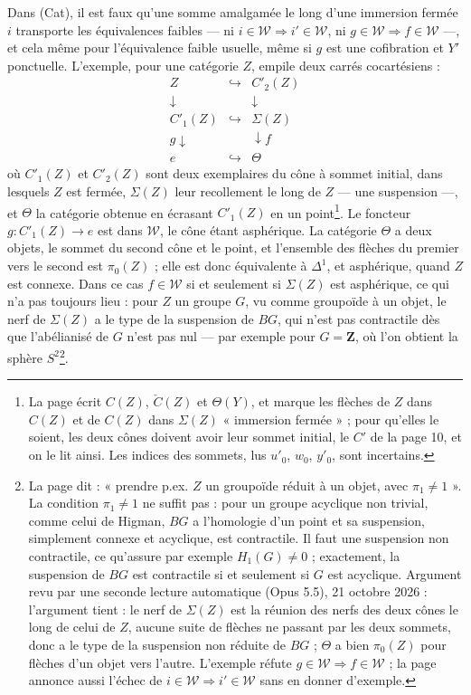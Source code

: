 \documentclass[11pt,a4paper]{article}
\begin{document}
Dans (Cat), il est faux qu'une somme amalgamée le long d'une immersion fermée
$i$ transporte les équivalences faibles --- ni $i \in \mathcal{W} \Rightarrow
i' \in \mathcal{W}$, ni $g \in \mathcal{W} \Rightarrow f \in \mathcal{W}$ ---,
et cela même pour l'équivalence faible usuelle, même si $g$ est une
cofibration et $Y'$ ponctuelle. L'exemple, pour une catégorie $Z$, empile deux
carrés cocartésiens :
\[
\begin{array}{ccc}
Z & \hookrightarrow & C'_{2}(Z) \\
\downarrow & & \downarrow \\
C'_{1}(Z) & \hookrightarrow & \Sigma(Z) \\
{\scriptstyle g}\downarrow & & \downarrow{\scriptstyle f} \\
e & \hookrightarrow & \Theta
\end{array}
\]
où $C'_{1}(Z)$ et $C'_{2}(Z)$ sont deux exemplaires du cône à sommet initial,
dans lesquels $Z$ est fermée, $\Sigma(Z)$ leur recollement le long de $Z$ ---
une suspension ---, et $\Theta$ la catégorie obtenue en écrasant $C'_{1}(Z)$
en un point\footnote{La page écrit $C(Z)$, $\check{C}(Z)$ et $\Theta(Y)$, et
marque les flèches de $Z$ dans $C(Z)$ et de $C(Z)$ dans $\Sigma(Z)$
« immersion fermée » ; pour qu'elles le soient, les deux cônes doivent avoir
leur sommet initial, le $C'$ de la page 10, et on le lit ainsi. Les indices
des sommets, lus $u'_{0}$, $w_{0}$, $y'_{0}$, sont incertains.}. Le
foncteur $g : C'_{1}(Z) \to e$ est dans $\mathcal{W}$, le cône étant
asphérique. La catégorie $\Theta$ a deux objets, le sommet du second cône et
le point, et l'ensemble des flèches du premier vers le second est $\pi_{0}(Z)$ ;
elle est donc équivalente à $\Delta^{1}$, et asphérique, quand $Z$ est
connexe. Dans ce cas $f \in \mathcal{W}$ si et seulement si $\Sigma(Z)$ est
asphérique, ce qui n'a pas toujours lieu : pour $Z$ un groupe $G$, vu comme
groupoïde à un objet, le nerf de $\Sigma(Z)$ a le type de la suspension de
$BG$, qui n'est pas contractile dès que l'abélianisé de $G$ n'est pas nul ---
par exemple pour $G = \mathbf{Z}$, où l'on obtient la sphère
$S^{2}$\footnote{La page dit : « prendre p.ex. $Z$ un groupoïde réduit à un
objet, avec $\pi_{1} \neq 1$ ». La condition $\pi_{1} \neq 1$ ne suffit pas :
pour un groupe acyclique non trivial, comme celui de Higman, $BG$ a l'homologie
d'un point et sa suspension, simplement connexe et acyclique, est
contractile. Il faut une suspension non contractile, ce qu'assure par exemple
$H_{1}(G) \neq 0$ ; exactement, la suspension de $BG$ est contractile si et seulement si $G$ est acyclique. Argument revu par une seconde lecture automatique (Opus 5.5), 21 octobre 2026 : l'argument tient : le nerf de $\Sigma(Z)$ est la réunion des nerfs des deux cônes le long de celui de $Z$, aucune suite de flèches ne passant par les deux sommets, donc a le type de la suspension non réduite de $BG$ ; $\Theta$ a bien $\pi_{0}(Z)$ pour flèches d'un objet vers l'autre. L'exemple réfute $g \in \mathcal{W} \Rightarrow f \in
\mathcal{W}$ ; la page annonce aussi l'échec de $i \in \mathcal{W} \Rightarrow
i' \in \mathcal{W}$ sans en donner d'exemple.}.
\end{document}
